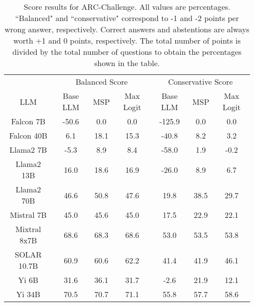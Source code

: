 \begin{table*}
\centering
\begin{tabular}{c|c|c|c|c|c|c}
& \multicolumn{3}{c|}{Balanced Score} & \multicolumn{3}{c}{Conservative Score} \\ 
LLM & Base LLM & MSP & Max Logit & Base LLM & MSP & Max Logit\\ \hline
Falcon 7B & -50.6 & 0.0 & 0.0 & -125.9 & 0.0 & 0.0\\
Falcon 40B & 6.1 & 18.1 & 15.3 & -40.8 & 8.2 & 3.2\\
Llama2 7B & -5.3 & 8.9 & 8.4 & -58.0 & 1.9 & -0.2\\
Llama2 13B & 16.0 & 18.6 & 16.9 & -26.0 & 8.9 & 6.7\\
Llama2 70B & 46.6 & 50.8 & 47.6 & 19.8 & 38.5 & 29.7\\
Mistral 7B & 45.0 & 45.6 & 45.0 & 17.5 & 22.9 & 22.1\\
Mixtral 8x7B & 68.6 & 68.3 & 68.6 & 53.0 & 53.5 & 53.8\\
SOLAR 10.7B & 60.9 & 60.6 & 62.2 & 41.4 & 41.9 & 46.1\\
Yi 6B & 31.6 & 36.1 & 31.7 & -2.6 & 21.9 & 12.1\\
Yi 34B & 70.5 & 70.7 & 71.1 & 55.8 & 57.7 & 58.6\\
\hline
\end{tabular}
\caption{Score results for ARC-Challenge. All values are percentages. ``Balanced" and ``conservative" correspond to -1 and -2 points per wrong answer, respectively. Correct answers and abstentions are always worth +1 and 0 points, respectively. The total number of points is divided by the total number of questions to obtain the percentages shown in the table.}
\label{tab:arc_score}
\end{table*}
